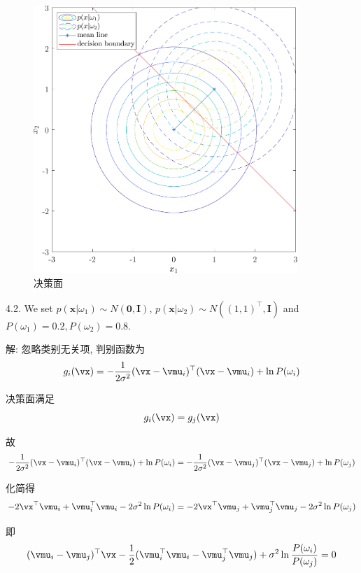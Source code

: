 \documentclass[openany]{ctexbook}
\theoremstyle{kaiti}
\theoremstyle{normal}
\begin{document}
\begin{figure}
  \centering
  \includegraphics[width=10cm]{mvnpdf-1.pdf}
  \caption{决策面}
  \label{fig:mvnpdf-1}
\end{figure}

4.2. We set $p(\bm{x}|\omega_1)\sim N(\bm{0},\bm{I})$, $p(\bm{x}|\omega_2)\sim N\left((1,1)^{\top},\bm{I}\right)$ and $P(\omega_1)=0.2, P(\omega_2)=0.8$.

解: 忽略类别无关项, 判别函数为
\begin{equation}
  g_i(\vx)=-\frac{1}{2\sigma^2}(\vx-\vmu_i)^{\top}(\vx-\vmu_i)+\ln P(\omega_i)
\end{equation}

决策面满足
\begin{equation}
  g_i(\vx)=g_j(\vx)
\end{equation}

故
\begin{equation}
  -\frac{1}{2\sigma^2}(\vx-\vmu_i)^{\top}(\vx-\vmu_i)+\ln P(\omega_i)=-\frac{1}{2\sigma^2}(\vx-\vmu_j)^{\top}(\vx-\vmu_j)+\ln P(\omega_j)
\end{equation}

化简得
\begin{equation}
  -2\vx^{\top}\vmu_i+\vmu_i^{\top}\vmu_i-2\sigma^2\ln P(\omega_i)
  =-2\vx^{\top}\vmu_j+\vmu_j^{\top}\vmu_j-2\sigma^2\ln P(\omega_j)
\end{equation}

即
\begin{equation}
  (\vmu_i-\vmu_j)^{\top}\vx-\frac{1}{2}(\vmu_i^{\top}\vmu_i-\vmu_j^{\top}\vmu_j)+\sigma^2\ln\frac{P(\omega_i)}{P(\omega_j)}=0
\end{equation}
\end{document}
